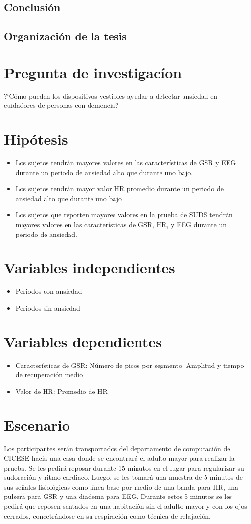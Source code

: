 \subsection{Conclusi\'on}
\subsection{Organizaci\'on de la tesis}
\section{Pregunta de investigac\'ion}
	?`C\'omo pueden los dispositivos vestibles ayudar a detectar ansiedad en cuidadores de personas con demencia?
\section{Hip\'otesis}
	\begin{itemize}
	\item{Los sujetos tendr\'an mayores valores en las caracter\'isticas de GSR y EEG durante un periodo de ansiedad alto que durante uno bajo.}
	\item{Los sujetos tendr\'an mayor valor HR promedio durante un periodo de ansiedad alto que durante uno bajo}
	\item{Los sujetos que reporten mayores valores en la prueba de SUDS tendr\'an mayores valores en las caracter\'isticas de GSR, HR, y EEG durante un periodo de ansiedad.}
	\end{itemize}
\section{Variables independientes}
	\begin{itemize}
		\item{Periodos con ansiedad}
		\item{Periodos sin ansiedad}
	\end{itemize}
\section{Variables dependientes}
	\begin{itemize}
		\item{Caracter\'isticas de GSR: N\'umero de picos por segmento, Amplitud y tiempo de recuperaci\'on medio}
		\item{Valor de HR: Promedio de HR}
	\end{itemize}
\section{Escenario}
	Los participantes ser\'an transportados del departamento de computaci\'on de CICESE hacia una casa donde se encontrar\'a el adulto mayor
	para realizar la prueba.
	Se les pedir\'a reposar durante 15 minutos en el lugar para regularizar su sudoraci\'on y ritmo cardiaco.
	Luego, se les tomar\'a una muestra de 5 minutos de sus se\~nales fisiol\'ogicas como l\'inea base por medio de una banda para HR, una pulsera para GSR y una diadema para EEG. Durante estos 5 minutos
	se les pedir\'a  que reposen sentados en una habitaci\'on sin el adulto mayor y con los ojos cerrados, concetr\'andose en su respiraci\'on como t\'ecnica de relajaci\'on.

